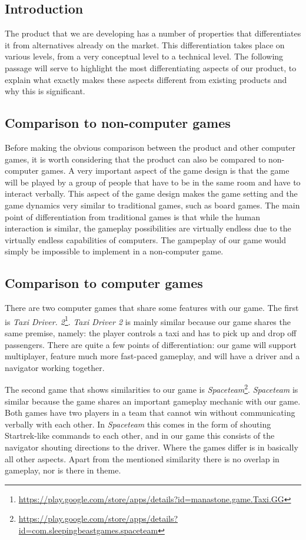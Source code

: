 

\subsection{Introduction}
The product that we are developing has a number of properties that differentiates it from alternatives already on the market. This differentiation takes place on various levels, from a very conceptual level to a technical level. The following passage will serve to highlight the most differentiating aspects of our product, to explain what exactly makes these aspects different from existing products and why this is significant.

\subsection{Comparison to non-computer games}
Before making the obvious comparison between the product and other computer games, it is worth considering that the product can also be compared to non-computer games. A very important aspect of the game design is that the game will be played by a group of people that have to be in the same room and have to interact verbally. This aspect of the game design makes the game setting and the game dynamics very similar to traditional games, such as board games. The main point of differentiation from traditional games is that while the human interaction is similar, the gameplay possibilities are virtually endless due to the virtually endless capabilities of computers. The gampeplay of our game would simply be impossible to implement in a non-computer game.

\subsection{Comparison to computer games}
There are two computer games that share some features with our game. The first is \emph{Taxi Driver.  2}\footnote{\url{https://play.google.com/store/apps/details?id=manastone.game.Taxi.GG}}. \emph{Taxi Driver 2} is mainly similar because our game shares the same premise, namely: the player controls a taxi and has to pick up and drop off passengers. There are quite a few points of differentiation: our game will support multiplayer, feature much more fast-paced gameplay, and will have a driver and a navigator working together.

The second game that shows similarities to our game is \emph{Spaceteam}\footnote{\url{https://play.google.com/store/apps/details?id=com.sleepingbeastgames.spaceteam}}. \emph{Spaceteam} is similar because the game shares an important gameplay mechanic with our game. Both games have two players in a team that cannot win without communicating verbally with each other. In \emph{Spaceteam} this comes in the form of shouting Startrek-like commands to each other, and in our game this consists of the navigator shouting directions to the driver. Where the games differ is in basically all other aspects. Apart from the mentioned similarity there is no overlap in gameplay, nor is there in theme.

